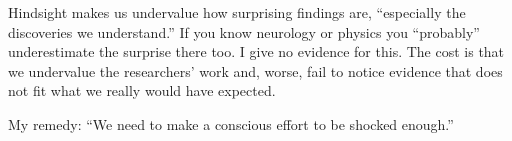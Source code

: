 Hindsight makes us undervalue how surprising findings are, ``especially the discoveries we understand.'' If you know neurology or physics you ``probably'' underestimate the surprise there too. I give no evidence for this. The cost is that we undervalue the researchers' work and, worse, fail to notice evidence that does not fit what we really would have expected. 

My remedy: ``We need to make a conscious effort to be shocked enough.'' 
